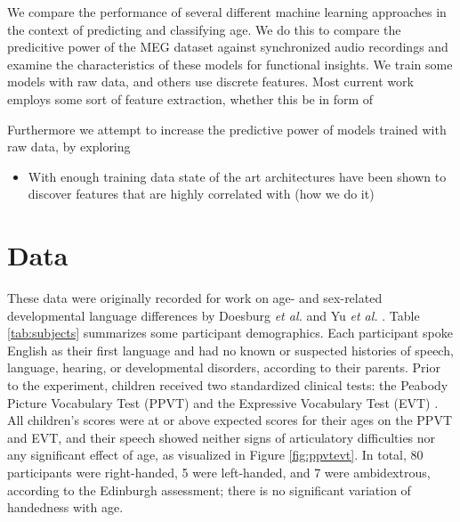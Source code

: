 \documentclass[utf8]{frontiersSCNS} %
\begin{document}
We compare the performance of several different machine learning approaches in the context of predicting and classifying age. We do this to compare the predicitive power of the MEG dataset against synchronized audio recordings and examine the characteristics of these models for functional insights.
We train some models with raw data, and others use discrete features. Most current work employs some sort of feature extraction, whether this be in form of 

Furthermore we attempt to increase the predictive power of models trained with raw data, by exploring 




\begin{itemize}
\item With enough training data state of the art architectures have been shown to discover features that are highly correlated with (how we do it)
\end{itemize}

\section{Data}

These data were originally recorded for work on age- and sex-related developmental language differences by Doesburg \emph{et al.} and Yu \emph{et al.} \cite{Doesburg2016, Yu2014}. Table \ref{tab:subjects} summarizes some participant demographics. Each participant spoke English as their first language and had no known or suspected histories of speech, language, hearing, or developmental disorders, according to their parents. Prior to the experiment, children received two standardized clinical tests: the Peabody Picture Vocabulary Test (PPVT) \cite{Dunn97} and the Expressive Vocabulary Test (EVT) \cite{EVT}. All children's scores were at or above expected scores for their ages on the PPVT and EVT, and their speech showed neither signs of articulatory difficulties nor any significant effect of age, as visualized in Figure \ref{fig:ppvtevt}. In total, 80 participants were right-handed, 5 were left-handed, and 7 were ambidextrous, according to the Edinburgh assessment; there is no significant variation of handedness with age.
\end{document}

